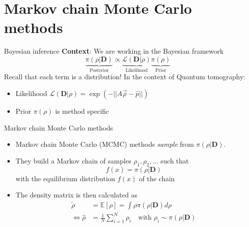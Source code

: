 \documentclass{beamer}
\newcommand{\mb}{\mathbf}
\newcommand{\tb}{\textbf}
\begin{document}
\section{Markov chain Monte Carlo methods}
\begin{frame}{Bayesian inference}
    \tb{Context}: We are working in the Bayesian framework
    \begin{equation}
        \underbrace{\pi (\rho|\mb D)}_{\text{Posterior}} \propto \underbrace{\mathcal{L}(\mb D|\rho)}_{\text{Likelihood}} \underbrace{\pi(\rho)}_{\text{Prior}}
    \end{equation}
    Recall that each term is a distribution!\medbreak
    In the context of Quantum tomography:
    \begin{itemize}
        \item Likelihood $\mathcal{L}(\mb D|\rho) = \exp(-||A \vec\rho - \hat p||)$
        \item Prior $\pi(\rho)$ is method specific
    \end{itemize}
\end{frame}
\begin{frame}{Markov chain Monte Carlo methods}
    \begin{itemize}
        \item Markov chain Monte Carlo (MCMC) methods \textit{sample} from $\pi (\rho|\mb D)$.
        \item They build a Markov chain of samples $\rho_1, \rho_2, \dots$ such that
        \begin{equation}
            f(x) =\pi (\rho|\mb D)
        \end{equation}
        with the equilibrium distribution $f(x)$ of the chain
        \item The density matrix is then calculated as
        \begin{align}
            \tilde \rho &= \mathbb{E}[\rho]= \int \rho \pi(\rho|\mb D) d\rho\\
            \Leftrightarrow \hat \rho &= \frac{1}{N}\sum_{i=1}^N \rho_i \quad \text{with } \rho_i \sim \pi(\rho|\mb D)
        \end{align}
            
    \end{itemize}
\end{frame}
\end{document}
